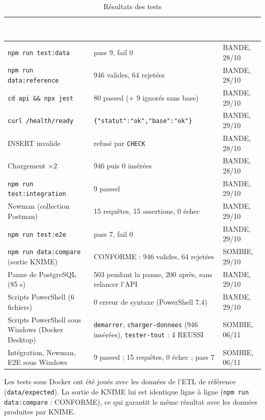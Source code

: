 \begin{table}[H]
\centering\small
\caption{Résultats des tests}
\begin{tabularx}{\linewidth}{|>{\raggedright\arraybackslash}p{5.2cm}|X|l|}
\hline
\rowcolor{bluedark}\textcolor{white}{\textbf{Commande}} & \textcolor{white}{\textbf{Résultat}} & \textcolor{white}{\textbf{Poste, date}} \\
\hline
\texttt{npm run test:data} & pass 9, fail 0 & BANDE, 28/10 \\
\hline
\texttt{npm run data:reference} & 946 valides, 64 rejetées & BANDE, 28/10 \\
\hline
\texttt{cd api \&\& npx jest} & 80 passed (+ 9 ignorés sans base) & BANDE, 29/10 \\
\hline
\texttt{curl /health/ready} & \texttt{\{"statut":"ok","base":"ok"\}} & BANDE, 29/10 \\
\hline
INSERT invalide & refusé par \texttt{CHECK} & BANDE, 28/10 \\
\hline
Chargement \(\times 2\) & 946 puis 0 insérées & BANDE, 28/10 \\
\hline
\texttt{npm run test:integration} & 9 passed & BANDE, 29/10 \\
\hline
Newman (collection Postman) & 15 requêtes, 15 assertions, 0 échec & BANDE, 29/10 \\
\hline
\texttt{npm run test:e2e} & pass 7, fail 0 & BANDE, 29/10 \\
\hline
\texttt{npm run data:compare} (sortie KNIME) & CONFORME : 946 valides, 64 rejetées & SOMBIE, 29/10 \\
\hline
Panne de PostgreSQL (85 s) & 503 pendant la panne, 200 après, sans relancer l'API & BANDE, 29/10 \\
\hline
Scripts PowerShell (6 fichiers) & 0 erreur de syntaxe (PowerShell 7.4) & BANDE, 29/10 \\
\hline
Scripts PowerShell sous Windows (Docker Desktop) & \texttt{demarrer}, \texttt{charger-donnees} (946 insérées), \texttt{tester-tout} : 4 REUSSI & SOMBIE, 06/11 \\
\hline
Intégration, Newman, E2E sous Windows & 9 passed ; 15 requêtes, 0 échec ; pass 7 & SOMBIE, 06/11 \\
\hline
\end{tabularx}
\end{table}

Les tests sous Docker ont été joués avec les données de l'ETL de référence (\texttt{data/expected}).
La sortie de KNIME lui est identique ligne à ligne (\texttt{npm run data:compare} : CONFORME), ce
qui garantit le même résultat avec les données produites par KNIME.

